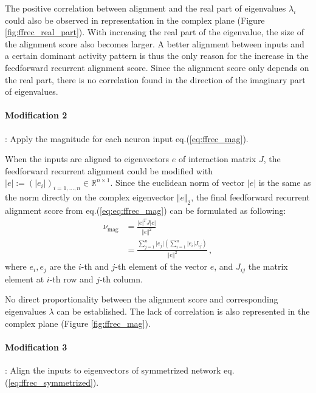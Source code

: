\documentclass[11pt]{article}
\begin{document}
	The positive correlation between alignment and the real part of eigenvalues $\lambda_i$ could also be observed in representation in the complex plane (Figure \ref{fig:ffrec_real_part}). With increasing the real part of the eigenvalue, the size of the alignment score also becomes larger. 
	A better alignment between inputs and a certain dominant activity pattern is thus the only reason for the increase in the feedforward recurrent alignment score. Since the alignment score only depends on the real part, there is no correlation found in the direction of the imaginary part of eigenvalues. 
	\vspace{1cm}
	\paragraph{Modification 2}: Apply the magnitude for each neuron input eq.(\ref{eq:ffrec_mag}).
	
	When the inputs are aligned to eigenvectors $e$ of interaction matrix $J$, the feedforward recurrent alignment could be modified with $\vert e \vert := (\vert e_{i} \vert)_{i = 1, ..., n} \in \mathbb{R}^{n \times 1}$. Since the euclidean norm of vector $\vert e \vert$ is the same as the norm directly on the complex eigenvector $\Vert e \Vert_2$, the final feedforward recurrent alignment score from eq.(\ref{eq:eq:ffrec_mag}) can be formulated as following:
		\begin{equation}
			\begin{split}
				\nu_{\text{mag}} & = \frac{\vert e \vert^T J \vert e \vert}{\Vert e \Vert^2} \\
				& = \frac{\sum_{j=1}^{n} \vert e_{j} \vert \left( \sum_{i = 1}^{n} \vert e_{i} \vert J_{ij} \right)}{\Vert e \Vert^2} \, ,
			\end{split}
		\end{equation}
	where $e_i, e_j$ are the $i$-th and $j$-th element of the vector $e$, and $J_{ij}$ the matrix element at $i$-th row and $j$-th column. 
	
	No direct proportionality between the alignment score and corresponding eigenvalues $\lambda$ can be established. The lack of correlation is also represented in the complex plane (Figure \ref{fig:ffrec_mag}). 
	\vspace{1cm}
	\paragraph{Modification 3}: Align the inputs to eigenvectors of symmetrized network eq.(\ref{eq:ffrec_symmetrized}).
	
\end{document}
